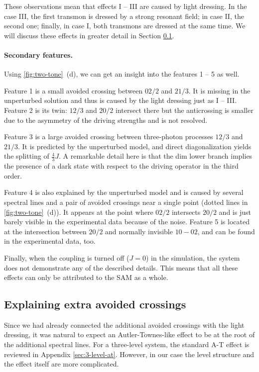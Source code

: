 \documentclass[%
 pra,
 amsmath,amssymb,
 reprint,%
]{revtex4-1}
\begin{document}
These observations mean that effects I -- III are 
caused by light dressing. In the case III, the 
first transmon is dressed by a strong resonant 
field; in case II, the second one; finally, in 
case I, both transmons are dressed at the same 
time. We will discuss these effects in greater 
detail in Section \ref{sec:theory}.

\paragraph{Secondary features.} Using 
\autoref{fig:two-tone}~(d), we can get an insight 
into the features 1 -- 5 as well. 

Feature 1 is a small avoided crossing between 
${02/2}$ and ${21/3}$. It is missing in the 
unperturbed solution and thus is caused by the 
light dressing just as I -- III. Feature 2 is its 
twin: ${12/3}$ and ${20/2}$ intersect there but 
the anticrossing is smaller due to the asymmetry 
of the driving strengths and is not resolved. 

Feature 3 is a large avoided crossing between 
three-photon processes ${12/3}$ and ${21/3}$. It 
is predicted by the unperturbed model, and direct 
diagonalization yields the splitting of 
$\frac{4}{3}J$. A remarkable detail here is that 
the dim lower branch implies the presence of a 
dark state with respect to the driving operator 
in the third order. 

Feature 4 is also explained by the unperturbed 
model and is caused by several spectral lines and 
a pair of avoided crossings near a single point 
(dotted lines in \autoref{fig:two-tone}~(d)). It 
appears at the point where ${02/2}$ intersects 
${20/2}$ and is just barely visible in the 
experimental data because of the noise. Feature 5 
is located at the intersection between ${20/2}$ 
and normally invisible ${10} - {02}$, and can be 
found in the experimental data, too. 

Finally, when the coupling is turned off ($J=0$) in the simulation, the system does not demonstrate any of the described details. This means that all these effects can only be attributed to the SAM as a whole. 

\subsection{Explaining extra avoided crossings}\label{sec:theory}

Since we had already connected the additional 
avoided crossings with the light dressing, it was 
natural to expect an Autler-Townes-like effect to 
be at the root of the additional spectral lines. 
For a three-level system, the standard A-T effect 
is reviewed in Appendix \ref{sec:3-level-at}. 
However, in our case the level structure and the 
effect itself are more complicated. 
\end{document}
